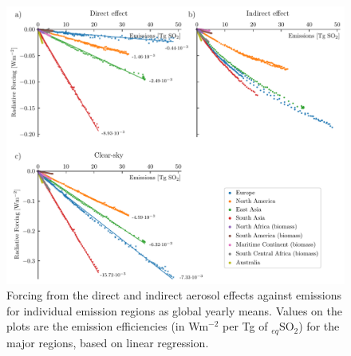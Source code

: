 \documentclass[draft]{agujournal2019}
\begin{document}
      \begin{figure}
            \centering
            \includegraphics[width=\textwidth]{../../figures/figure2}
            \caption{Forcing from the direct and indirect aerosol effects against emissions for individual emission regions as global yearly means. Values on the plots are the emission efficiencies (in Wm$^{-2}$ per Tg of $_{eq}$SO$_2$) for the major regions, based on linear regression.}
      \label{fig:individual-plumes}
      \end{figure}
\end{document}
